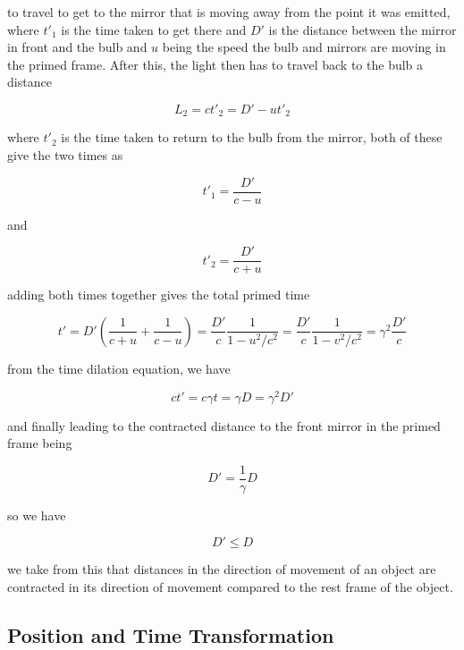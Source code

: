 to travel to get to the mirror that is moving away from the point it was emitted, where $t'_1$ is the time taken to get there and $D'$ is the distance between the mirror in front and the bulb and $u$ being the speed the bulb and mirrors are moving in the primed frame. After this, the light then has to travel back to the bulb a distance

\begin{equation}
	L_2 = ct'_2= D' - ut'_2
\end{equation}

where $t'_2$ is the time taken to return to the bulb from the mirror, both of these give the two times as

\begin{equation}
	t'_1=\frac{D'}{c-u}
\end{equation}

and

\begin{equation}
	t'_2=\frac{D'}{c+u}
\end{equation}

adding both times together gives the total primed time

\begin{equation}
	t' = D'(\frac{1}{c+u} + \frac{1}{c-u})=\frac{D'}{c}\frac{1}{1-u^2/c^2} =\frac{D'}{c}\frac{1}{1-v^2/c^2}=\gamma^2 \frac{D'}{c}
\end{equation}

from the time dilation equation, we have

\begin{equation}
	ct'=c\gamma t = \gamma D = \gamma^2 D'
\end{equation}

and finally leading to the contracted distance to the front mirror in the primed frame being

\begin{equation}
	D' = \frac{1}{\gamma}D
\end{equation}

so we have

\begin{equation}
	D' \leq D
\end{equation}

we take from this that distances in the direction of movement of an object are contracted in its direction of movement compared to the rest frame of the object.

\subsection{Position and Time Transformation}

